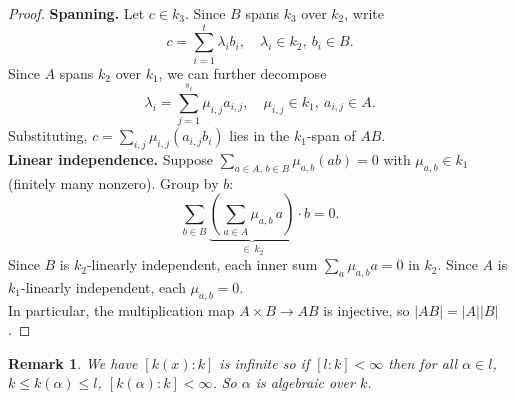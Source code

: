 \documentclass[a4paper,12pt]{article}
\newtheorem{rmk}[thm]{Remark}
\begin{document}
\begin{proof}
    \textbf{Spanning.} Let $c\in k_3$. Since $B$ spans $k_3$ over $k_2$, write
    \[
    c=\sum_{i=1}^t \lambda_i b_i, \quad \lambda_i\in k_2,\ b_i\in B.
    \]
    Since $A$ spans $k_2$ over $k_1$, we can further decompose
    \[
    \lambda_i = \sum_{j=1}^{s_i} \mu_{i,j} a_{i,j}, \quad \mu_{i,j}\in k_1,\ a_{i,j}\in A.
    \]
    Substituting, $c=\sum_{i,j}\mu_{i,j}(a_{i,j}b_i)$ lies in the $k_1$-span of $AB$.\\
    \textbf{Linear independence.} Suppose $\sum_{a\in A,\,b\in B}\mu_{a,b}(ab)=0$ with $\mu_{a,b}\in k_1$ (finitely many nonzero). Group by $b$:
    \[
    \sum_{b\in B}\underbrace{\left(\sum_{a\in A}\mu_{a,b}\, a\right)}_{\in\, k_2}\cdot b=0.
    \]
    Since $B$ is $k_2$-linearly independent, each inner sum $\sum_{a}\mu_{a,b}a=0$ in $k_2$. Since $A$ is $k_1$-linearly independent, each $\mu_{a,b}=0$.\\
    In particular, the multiplication map $A\times B\to AB$ is injective, so $|AB|=|A||B|$.
\end{proof}
\begin{rmk}
    We have $[k(x):k]$ is infinite so if $[l:k]<\infty$ then for all $\alpha\in l$, $k\leq k(\alpha)\leq l$, $[k(\alpha):k]<\infty$. So $\alpha$ is algebraic over $k$. 
\end{rmk}
\newpage
\end{document}
